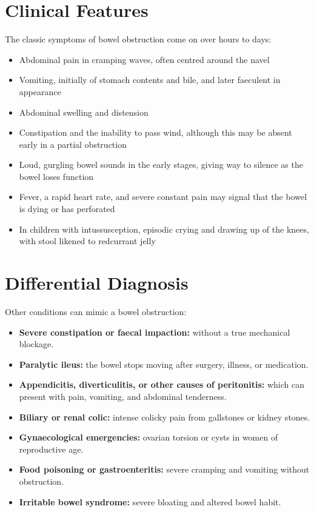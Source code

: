 \section*{Clinical Features}
The classic symptoms of bowel obstruction come on over hours to days:
\begin{itemize}
    \item Abdominal pain in cramping waves, often centred around the navel
    \item Vomiting, initially of stomach contents and bile, and later faeculent in appearance
    \item Abdominal swelling and distension
    \item Constipation and the inability to pass wind, although this may be absent early in a partial obstruction
    \item Loud, gurgling bowel sounds in the early stages, giving way to silence as the bowel loses function
    \item Fever, a rapid heart rate, and severe constant pain may signal that the bowel is dying or has perforated
    \item In children with intussusception, episodic crying and drawing up of the knees, with stool likened to redcurrant jelly
\end{itemize}

\section*{Differential Diagnosis}
Other conditions can mimic a bowel obstruction:
\begin{itemize}
    \item \textbf{Severe constipation or faecal impaction:} without a true mechanical blockage.
    \item \textbf{Paralytic ileus:} the bowel stops moving after surgery, illness, or medication.
    \item \textbf{Appendicitis, diverticulitis, or other causes of peritonitis:} which can present with pain, vomiting, and abdominal tenderness.
    \item \textbf{Biliary or renal colic:} intense colicky pain from gallstones or kidney stones.
    \item \textbf{Gynaecological emergencies:} ovarian torsion or cysts in women of reproductive age.
    \item \textbf{Food poisoning or gastroenteritis:} severe cramping and vomiting without obstruction.
    \item \textbf{Irritable bowel syndrome:} severe bloating and altered bowel habit.
\end{itemize}

